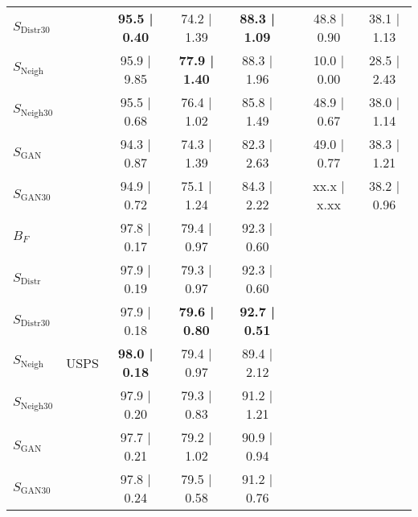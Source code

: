 \begin{table}[t]
\begin{minipage}[t]{0.98\textwidth}
{\begin{tabular}{lccccccc}
$S_{\text{Distr}30}$   &                           & \textbf{95.5 | 0.40}      & 74.2 | 1.39              & \textbf{88.3 | 1.09}       &                            & 48.8 | 0.90                   & 38.1 | 1.13   \\ 
$S_{\text{Neigh}}$     &                           & 95.9 | 9.85               & \textbf{77.9 | 1.40}      & 88.3 | 1.96                &                            & 10.0 | 0.00                  & 28.5 | 2.43  \\  
$S_{\text{Neigh}30}$   &                           & 95.5 | 0.68               & 76.4 | 1.02              & 85.8 | 1.49                &                            & 48.9 | 0.67 	                & 38.0 | 1.14 	   \\  
$S_{\text{GAN}}$     &                           & 94.3 | 0.87               & 74.3 | 1.39              & 82.3 | 2.63                &                             & 49.0 | 0.77 	                & 38.3 | 1.21 	   \\
$S_{\text{GAN}30}$   &                           & 94.9 | 0.72               & 75.1 | 1.24              & 84.3 | 2.22                &                             & xx.x | x.xx 	                & 38.2 | 0.96 	   \\  

$B_F$       & \multirow{7}{*}{USPS}     &  97.8 | 0.17              & 79.4 | 0.97      & 92.3 | 0.60                \\ 
$S_{\text{Distr}}$     &                           &  97.9 | 0.19              & 79.3 | 0.97              & 92.3 | 0.60                \\ 
$S_{\text{Distr}30}$   &                           & 97.9 | 0.18               & \textbf{79.6 | 0.80}     & \textbf{92.7 | 0.51}               \\
$S_{\text{Neigh}}$     &                           & \textbf{98.0 | 0.18}      & 79.4 | 0.97              & 89.4 | 2.12                \\ 
$S_{\text{Neigh}30}$   &                           & 97.9 | 0.20               & 79.3 | 0.83              & 91.2 | 1.21               \\ 
$S_{\text{GAN}}$     &                           & 97.7 | 0.21               & 79.2 | 1.02              & 90.9 | 0.94                \\  
$S_{\text{GAN}30}$   &                           & 97.8 | 0.24               & 79.5 | 0.58              & 91.2 | 0.76                \\  
\bottomrule
\end{tabular}
}

\end{minipage}
\end{table}

